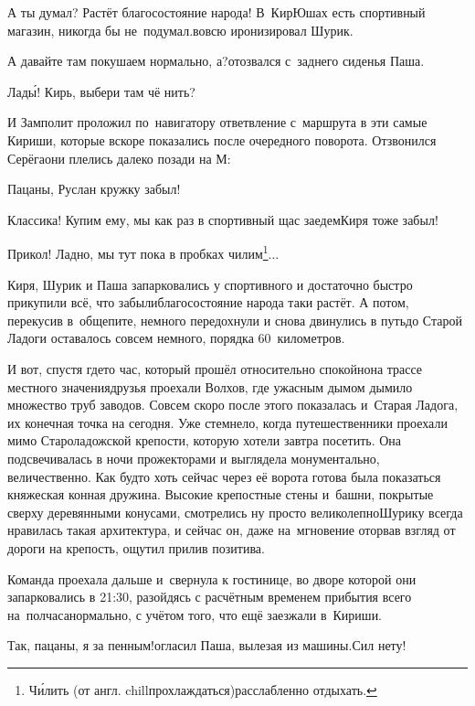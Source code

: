 \diagdash А ты думал? Растёт благосостояние народа! В~КирЮшах есть спортивный магазин, никогда бы не~подумал.\mdash вовсю иронизировал Шурик.

\diagdash А давайте там покушаем нормально, а?\mdash отозвался с~заднего сиденья Паша.

\diagdash Лад\'{ы}! Кирь, выбери там чё нить?

И Замполит проложил по~навигатору ответвление с~маршрута в эти самые Кириши, которые вскоре показались после очередного поворота. Отзвонился Серёга\mdash они плелись далеко позади на М:

\diagdash Пацаны, Руслан кружку забыл!

\diagdash Классика! Купим ему, мы как раз в спортивный щас заедем\mdash Киря тоже забыл!

\renewcommand*{\thefootnote}{\fnsymbol{footnote}}
\setcounter{footnote}{0}
\diagdash Прикол! Ладно, мы тут пока в пробках чилим\footnote{Ч\'{и}лить (от англ. chill\mdash прохлаждаться)\mdash расслабленно отдыхать.}$\ldots$

Киря, Шурик и Паша запарковались у спортивного и достаточно быстро прикупили всё, что забыли\mdash благосостояние народа таки растёт. А потом, перекусив в~общепите, немного передохнули и снова двинулись в путь\mdash до Старой Ладоги оставалось совсем немного, порядка 60~километров.

И вот, спустя где\sdash то час, который прошёл относительно спокойно\mdash на трассе местного значения\mdash друзья проехали Волхов, где ужасным дымом дымило множество труб заводов. Совсем скоро после этого показалась и~Старая Ладога, их конечная точка на сегодня. Уже стемнело, когда путешественники проехали мимо Староладожской крепости, которую хотели завтра посетить. Она подсвечивалась в ночи прожекторами и выглядела монументально, величественно. Как будто хоть сейчас через её ворота готова была показаться княжеская конная дружина. Высокие крепостные стены и~башни, покрытые сверху деревянными конусами, смотрелись ну просто великолепно\mdash Шурику всегда нравилась такая архитектура, и сейчас он, даже на~мгновение оторвав взгляд от дороги на крепость, ощутил прилив позитива. 

Команда проехала дальше и~свернула к гостинице, во дворе которой они запарковались в 21:30, разойдясь с расчётным временем прибытия всего на~полчаса\mdash нормально, с учётом того, что ещё заезжали в~Кириши.

\diagdash Так, пацаны, я за пенным!\mdash огласил Паша, вылезая из машины.\mdash Сил нету!

